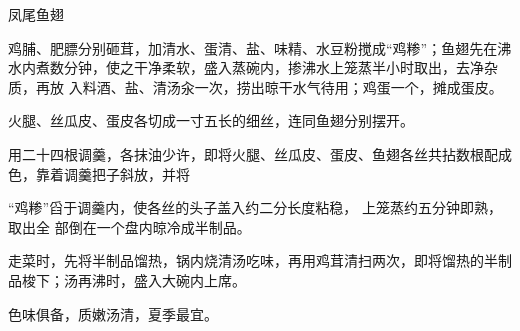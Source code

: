 \begin{recipe}{凤尾鱼翅}

\ingredients


\preparation

\step 鸡脯、肥膘分别砸茸，加清水、蛋清、盐、味精、水豆粉搅成“鸡糁”；鱼翅先在沸
水内煮数分钟，使之干净柔软，盛入蒸碗内，掺沸水上笼蒸半小时取出，去净杂质，再放
入料酒、盐、清汤汆一次，捞出晾干水气待用；鸡蛋一个，摊成蛋皮。

\step 火腿、丝瓜皮、蛋皮各切成一寸五长的细丝，连同鱼翅分别摆开。

\step 用二十四根调羹，各抹油少许，即将火腿、丝瓜皮、蛋皮、鱼翅各丝共拈数根配成
色，靠着调羹把子斜放，并将

“鸡糁”舀于调羹内，使各丝的头子盖入约二分长度粘稳， 上笼蒸约五分钟即熟，取出全
部倒在一个盘内晾冷成半制品。

\step 走菜时，先将半制品馏热，锅内烧清汤吃味，再用鸡茸清扫两次，即将馏热的半制
品梭下；汤再沸时，盛入大碗内上席。

\features

色味俱备，质嫩汤清，夏季最宜。

\end{recipe}

